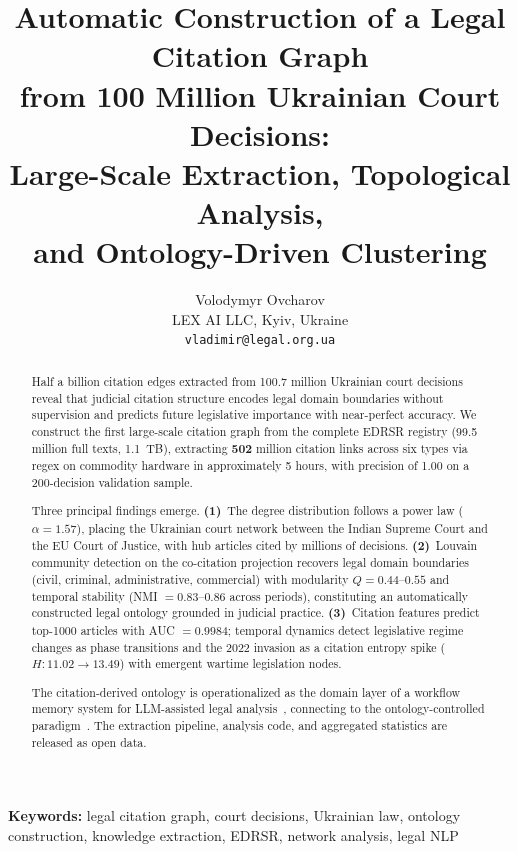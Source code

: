 \documentclass[11pt]{article}
\title{Automatic Construction of a Legal Citation Graph\\from 100 Million Ukrainian Court Decisions:\\Large-Scale Extraction, Topological Analysis,\\and Ontology-Driven Clustering}
\author{
  Volodymyr Ovcharov \\[6pt]
  LEX AI LLC, Kyiv, Ukraine \\[4pt]
  \texttt{vladimir@legal.org.ua}
}
\date{}
\begin{document}
\maketitle

\begin{abstract}

Half a billion citation edges extracted from 100.7 million Ukrainian court decisions reveal that judicial citation structure encodes legal domain boundaries without supervision and predicts future legislative importance with near-perfect accuracy.
We construct the first large-scale citation graph from the complete EDRSR registry (99.5 million full texts, 1.1~TB), extracting \textbf{502} million citation links across six types via regex on commodity hardware in approximately 5 hours, with precision of 1.00 on a 200-decision validation sample.

Three principal findings emerge.
\textbf{(1)}~The degree distribution follows a power law ($\alpha = 1.57$), placing the Ukrainian court network between the Indian Supreme Court and the EU Court of Justice, with hub articles cited by millions of decisions.
\textbf{(2)}~Louvain community detection on the co-citation projection recovers legal domain boundaries (civil, criminal, administrative, commercial) with modularity $Q = 0.44$--$0.55$ and temporal stability (NMI $= 0.83$--$0.86$ across periods), constituting an automatically constructed legal ontology grounded in judicial practice.
\textbf{(3)}~Citation features predict top-1000 articles with AUC $= 0.9984$; temporal dynamics detect legislative regime changes as phase transitions and the 2022 invasion as a citation entropy spike ($H: 11.02 \to 13.49$) with emergent wartime legislation nodes.

The citation-derived ontology is operationalized as the domain layer of a workflow memory system for LLM-assisted legal analysis~\citep{ovcharov2026workflowmemory}, connecting to the ontology-controlled paradigm~\citep{palagin2006architecture,palagin2023ontochatgpt}.
The extraction pipeline, analysis code, and aggregated statistics are released as open data.

\end{abstract}

\medskip
\noindent\textbf{Keywords:} legal citation graph, court decisions, Ukrainian law, ontology construction, knowledge extraction, EDRSR, network analysis, legal NLP
\end{document}
